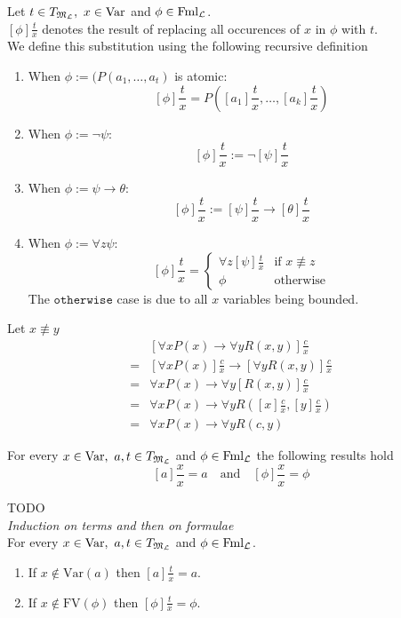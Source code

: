 \documentclass[11pt,a4paper]{article}
\begin{document}
Let $t\in T_{\M_\LL},\ x\in\text{Var}$ and $\phi\in\text{Fml}_{\mathcal{L}}$.\\
$[\phi]\frac{t}x$ denotes the result of replacing all occurences of $x$ in $\phi$ with $t$.\\
We define this substitution using the following recursive definition
\begin{enumerate}
	\item When $\phi:=(P(a_1,\dots,a_t)$ is atomic:
	$$[\phi]\frac{t}x=P\left([a_1]\frac{t}x,\dots,[a_k]\frac{t}x\right)$$
	\item When $\phi:=\neg\psi$:
	$$[\phi]\frac{t}x:=\neg[\psi]\frac{t}x$$
	\item When $\phi:=\psi\to\theta$:
	$$[\phi]\frac{t}x:=[\psi]\frac{t}x\to[\theta]\frac{t}x$$
	\item When $\phi:=\forall z\psi$:
	$$[\phi]\frac{t}x=\begin{cases}\forall z[\psi]\frac{t}x&\text{if }x\not\equiv z\\\phi&\text{otherwise}\end{cases}$$
	\nb The $\mathtt{otherwise}$ case is due to all $x$ variables being bounded.
\end{enumerate}

Let $x\not\equiv y$
\[\begin{array}{rl}
&[\forall xP(x)\to\forall yR(x,y)]\frac{c}x\\
=&[\forall xP(x)]\frac{c}x\to[\forall yR(x,y)]\frac{c}x\\
=&\forall xP(x)\to\forall y[R(x,y)]\frac{c}x\\
=&\forall xP(x)\to\forall yR([x]\frac{c}x,[y]\frac{c}x)\\
=&\forall xP(x)\to\forall yR(c,y)
\end{array}\]

\proposition{}
For every $x\in\text{Var},\ a,t\in T_{\mathfrak{M}_{\mathcal{L}}}$ and $\phi\in\text{Fml}_{\mathcal{L}}$ the following results hold
$$[a]\frac{x}{x}=a\quad\text{and}\quad[\phi]\frac{x}{x}=\phi$$

TODO\\
\textit{Induction on terms and then on formulae}\\

\proposition{}
For every $x\in\text{Var},\ a,t\in T_{\mathfrak{M}_{\mathcal{L}}}$ and $\phi\in\text{Fml}_{\mathcal{L}}$.
\begin{enumerate}
	\item If $x\not\in\text{Var}(a)$ then $[a]\frac{t}{x}=a$.
	\item If $x\not\in\text{FV}(\phi)$ then $[\phi]\frac{t}{x}=\phi$.
\end{enumerate}
\end{document}
